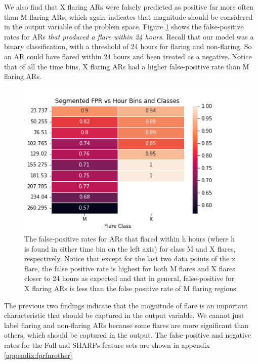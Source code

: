 \documentclass[defaultstyle,11pt]{thesis}
\begin{document}
We also find that X flaring ARs were falsely predicted as positive far more often than M flaring ARs, which again indicates that magnitude should be considered in the output variable of the problem space. Figure \ref{fig:segfpr} shows the false-positive rates for ARs \textit{that produced a flare within 24 hours}. Recall that our model was a binary classification, with a threshold of 24 hours for flaring and non-flaring. So an AR could have flared within 24 hours and been treated as a negative. Notice that of all the time bins, X flaring ARs had a higher false-positive rate than M flaring ARs. 
\begin{figure}[h!]
    \centering
    \includegraphics[width=0.6\linewidth]{ThesisFilePkg/figures/findings/SegmentedFPR.png}
    \caption{The false-positive rates for ARs that flared within h hours (where h is found in either time bin on the left axis) for class M and X flares, respectively. Notice that except for the last two data points of the x flare, the false positive rate is highest for both M flares and X flares closer to 24 hours as expected and that in general, false-positive for X flaring ARs is less than the false positive rate of M flaring regions.}
    \label{fig:segfpr}
\end{figure}

The previous two findings indicate that the magnitude of flare is an important characteristic that should be captured in the output variable. We cannot just label flaring and non-flaring ARs because some flares are more significant than others, which should be captured in the output. The false-positive and negative rates for the Full and SHARPs feature sets are shown in appendix \ref{appendix:fprfnrother}
\end{document}
